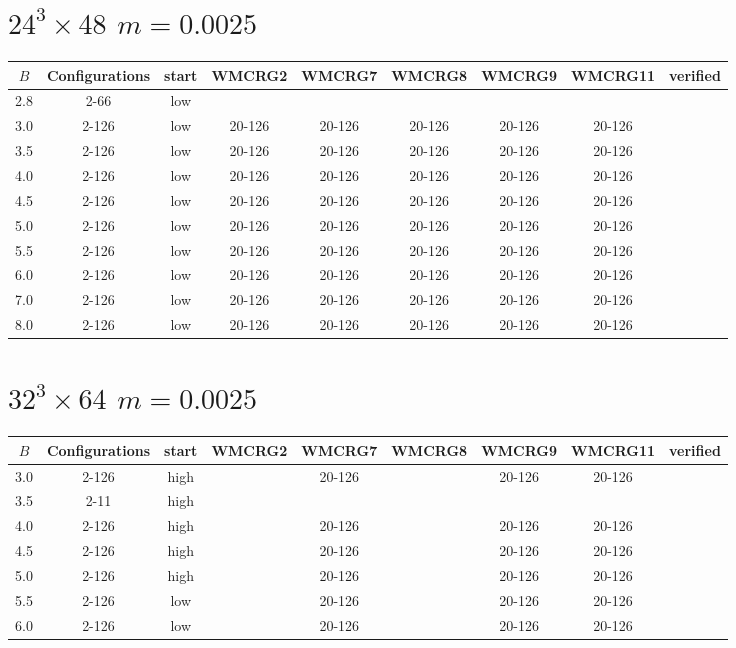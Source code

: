 \documentclass{article}
\begin{document}
  \section*{$24^3\times48$  $m=0.0025$}
    \begin{center}
    \begin{tabular}{| c | c | c | c | c | c | c | c | c |}
      \hline
      $B$ & Configurations & start & WMCRG2 & WMCRG7 & WMCRG8 & WMCRG9 & WMCRG11 & verified\\
      \hline
      2.8 & 2-66  & low &  &  &  &  &  &\\
      3.0 & 2-126 & low & 20-126 & 20-126 & 20-126 & 20-126 & 20-126 &\\
      3.5 & 2-126 & low & 20-126 & 20-126 & 20-126 & 20-126 & 20-126 &\\
      4.0 & 2-126 & low & 20-126 & 20-126 & 20-126 & 20-126 & 20-126 &\\
      4.5 & 2-126 & low & 20-126 & 20-126 & 20-126 & 20-126 & 20-126 &\\
      5.0 & 2-126 & low & 20-126 & 20-126 & 20-126 & 20-126 & 20-126 &\\
      5.5 & 2-126 & low & 20-126 & 20-126 & 20-126 & 20-126 & 20-126 &\\
      6.0 & 2-126 & low & 20-126 & 20-126 & 20-126 & 20-126 & 20-126 &\\ %
      7.0 & 2-126 & low & 20-126 & 20-126 & 20-126 & 20-126 & 20-126 &\\ %
      8.0 & 2-126 & low & 20-126 & 20-126 & 20-126 & 20-126 & 20-126 &\\
      \hline
    \end{tabular}
    \end{center}
  \section*{$32^3\times64$  $m=0.0025$}
    \begin{center}
    \begin{tabular}{| c | c | c | c | c | c | c | c | c |}
      \hline
      $B$ & Configurations & start & WMCRG2 & WMCRG7 & WMCRG8 & WMCRG9 & WMCRG11 & verified\\
      \hline
      3.0 & 2-126 & high &  & 20-126 &  & 20-126 & 20-126 &\\
      3.5 & 2-11  & high &  &  &  &  &  &\\
      4.0 & 2-126 & high &  & 20-126 &  & 20-126 & 20-126 &\\
      4.5 & 2-126 & high &  & 20-126 &  & 20-126 & 20-126 &\\
      5.0 & 2-126 & high &  & 20-126 &  & 20-126 & 20-126 &\\
      5.5 & 2-126 & low  &  & 20-126 &  & 20-126 & 20-126 &\\
      6.0 & 2-126 & low  &  & 20-126 &  & 20-126 & 20-126 &\\
      \hline
    \end{tabular}
    \end{center}
\end{document}
